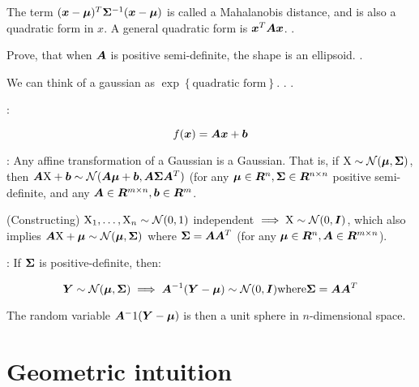 The term $({\bm{x}} - {\bm{\mu}})^T {\bm{\Sigma}}^{-1}({\bm{x}} - {\bm{\mu}})$ is called a Mahalanobis distance, and is also a quadratic form in $x$. A general quadratic form is ${\bm{x}}^T {\bm{A}} {\bm{x}}$. .

Prove, that when ${\bm{A}}$ is positive semi-definite, the shape is an ellipsoid. .

We can think of a gaussian as $\exp{\left\{ \text{quadratic form} \right\} }$. . .

\begin{defn}
:

\begin{equation}
    f({\bm{x}}) = {\bm{A}} {\bm{x}} + {\bm{b}}
\end{equation}
\end{defn}

\begin{thm}
: Any affine transformation of a Gaussian is a Gaussian. That is, if ${\textnormal{X}} \sim {\mathcal{N}}({\bm{\mu}}, {\bm{\Sigma}})$, then ${\bm{A}} {\textnormal{X}} + {\bm{b}} \sim {\mathcal{N}}({\bm{A}} {\bm{\mu}} + {\bm{b}}, {\bm{A}} {\bm{\Sigma}} {\bm{A}}^T)$ (for any ${\bm{\mu}} \in {\bm{R}}^n, {\bm{\Sigma}} \in {\bm{R}}^{n \times n}$ positive semi-definite, and any ${\bm{A}} \in {\bm{R}}^{m \times n}, {\bm{b}} \in {\bm{R}}^m$.

(Constructing) ${\textnormal{X}}_1, \dots, {\textnormal{X}}_n \sim {\mathcal{N}}(0, 1)$ independent $\implies {\textnormal{X}} \sim {\mathcal{N}}(0, {\bm{I}})$, which also implies ${\bm{A}} {\textnormal{X}} + {\bm{\mu}} \sim {\mathcal{N}}({\bm{\mu}}, {\bm{\Sigma}})$ where ${\bm{\Sigma}} = {\bm{A}} {\bm{A}}^T$ (for any ${\bm{\mu}} \in {\bm{R}}^n, {\bm{A}} \in {\bm{R}}^{m \times n}$).
\end{thm}

\begin{thm}
: If ${\bm{\Sigma}}$ is positive-definite, then:

\begin{equation}
    {\bm{Y}} \sim {\mathcal{N}}({\bm{\mu}}, {\bm{\Sigma}}) \implies {\bm{A}}^{-1} ({\bm{Y}} - {\bm{\mu}}) \sim {\mathcal{N}}(0, {\bm{I}}) \text{where} {\bm{\Sigma}} = {\bm{A}} {\bm{A}}^T
\end{equation}

The random variable ${\bm{A}}^-1 ({\bm{Y}} - {\bm{\mu}})$ is then a unit sphere in $n$-dimensional space.
\end{thm}

\section{Geometric intuition}

